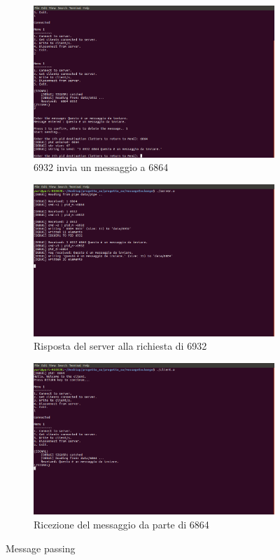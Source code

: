 \begin{figure}
\centering
\begin{subfigure}[b]{0.7\textwidth}
\includegraphics[width=\textwidth]{screenmsg/8_client_6932}
\caption{6932 invia un messaggio a 6864}
\end{subfigure}
\begin{subfigure}[b]{0.7\textwidth}
\includegraphics[width=\textwidth]{screenmsg/9_server}
\caption{Risposta del server alla richiesta di 6932}
\end{subfigure}
\begin{subfigure}[b]{0.7\textwidth}
\includegraphics[width=\textwidth]{screenmsg/10_client_6864}
\caption{Ricezione del messaggio da parte di 6864}
\end{subfigure}
\caption{Message passing}
\end{figure}

